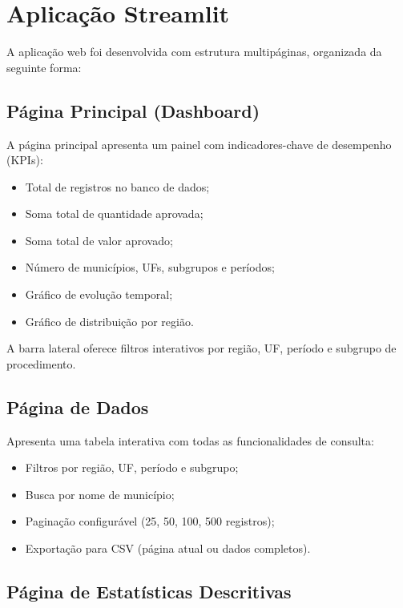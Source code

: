 \documentclass[
    12pt,
    oneside,
    a4paper,
    chapter=TITLE,
    section=TITLE
]{abntex2}
\begin{document}
\section{Aplicação Streamlit}

A aplicação web foi desenvolvida com estrutura multipáginas, organizada da seguinte forma:

\subsection{Página Principal (Dashboard)}

A página principal apresenta um painel com indicadores-chave de desempenho (KPIs):

\begin{itemize}
    \item Total de registros no banco de dados;
    \item Soma total de quantidade aprovada;
    \item Soma total de valor aprovado;
    \item Número de municípios, UFs, subgrupos e períodos;
    \item Gráfico de evolução temporal;
    \item Gráfico de distribuição por região.
\end{itemize}

A barra lateral oferece filtros interativos por região, UF, período e subgrupo de procedimento.

\subsection{Página de Dados}

Apresenta uma tabela interativa com todas as funcionalidades de consulta:

\begin{itemize}
    \item Filtros por região, UF, período e subgrupo;
    \item Busca por nome de município;
    \item Paginação configurável (25, 50, 100, 500 registros);
    \item Exportação para CSV (página atual ou dados completos).
\end{itemize}

\subsection{Página de Estatísticas Descritivas}
\end{document}
